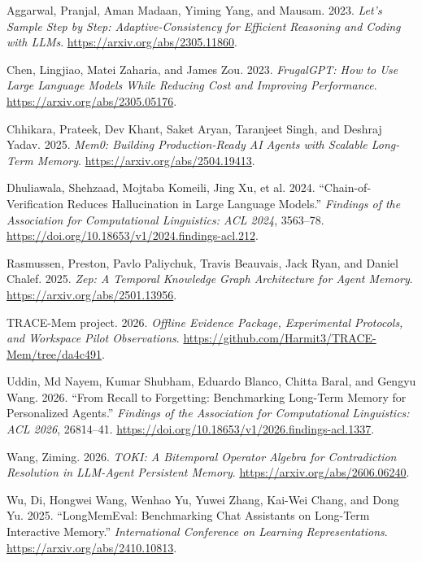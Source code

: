 \documentclass[
  11pt,
]{article}
\newlength{\cslhangindent}
\newenvironment{CSLReferences}[2] %
 {\begin{list}{}{%
  \setlength{\itemindent}{0pt}
  \setlength{\leftmargin}{0pt}
  \setlength{\parsep}{0pt}
  \ifodd #1
   \setlength{\leftmargin}{\cslhangindent}
   \setlength{\itemindent}{-1\cslhangindent}
  \fi
  \setlength{\itemsep}{#2\baselineskip}}}
 {\end{list}}
\begin{document}
\protect{}\label{refs}
\begin{CSLReferences}{1}{1}
Aggarwal, Pranjal, Aman Madaan, Yiming Yang, and Mausam. 2023.
\emph{Let's Sample Step by Step: Adaptive-Consistency for Efficient
Reasoning and Coding with LLMs}. \url{https://arxiv.org/abs/2305.11860}.

Chen, Lingjiao, Matei Zaharia, and James Zou. 2023. \emph{{FrugalGPT}:
How to Use Large Language Models While Reducing Cost and Improving
Performance}. \url{https://arxiv.org/abs/2305.05176}.

Chhikara, Prateek, Dev Khant, Saket Aryan, Taranjeet Singh, and Deshraj
Yadav. 2025. \emph{{Mem0}: Building Production-Ready AI Agents with
Scalable Long-Term Memory}. \url{https://arxiv.org/abs/2504.19413}.

Dhuliawala, Shehzaad, Mojtaba Komeili, Jing Xu, et al. 2024.
{``Chain-of-Verification Reduces Hallucination in Large Language
Models.''} \emph{Findings of the Association for Computational
Linguistics: ACL 2024}, 3563--78.
\url{https://doi.org/10.18653/v1/2024.findings-acl.212}.

Rasmussen, Preston, Pavlo Paliychuk, Travis Beauvais, Jack Ryan, and
Daniel Chalef. 2025. \emph{Zep: A Temporal Knowledge Graph Architecture
for Agent Memory}. \url{https://arxiv.org/abs/2501.13956}.

TRACE-Mem project. 2026. \emph{Offline Evidence Package, Experimental
Protocols, and Workspace Pilot Observations}.
\url{https://github.com/Harmit3/TRACE-Mem/tree/da4c491}.

Uddin, Md Nayem, Kumar Shubham, Eduardo Blanco, Chitta Baral, and Gengyu
Wang. 2026. {``From Recall to Forgetting: Benchmarking Long-Term Memory
for Personalized Agents.''} \emph{Findings of the Association for
Computational Linguistics: ACL 2026}, 26814--41.
\url{https://doi.org/10.18653/v1/2026.findings-acl.1337}.

Wang, Ziming. 2026. \emph{{TOKI}: A Bitemporal Operator Algebra for
Contradiction Resolution in LLM-Agent Persistent Memory}.
\url{https://arxiv.org/abs/2606.06240}.

Wu, Di, Hongwei Wang, Wenhao Yu, Yuwei Zhang, Kai-Wei Chang, and Dong
Yu. 2025. {``{LongMemEval}: Benchmarking Chat Assistants on Long-Term
Interactive Memory.''} \emph{International Conference on Learning
Representations}. \url{https://arxiv.org/abs/2410.10813}.


\end{CSLReferences}
\end{document}
